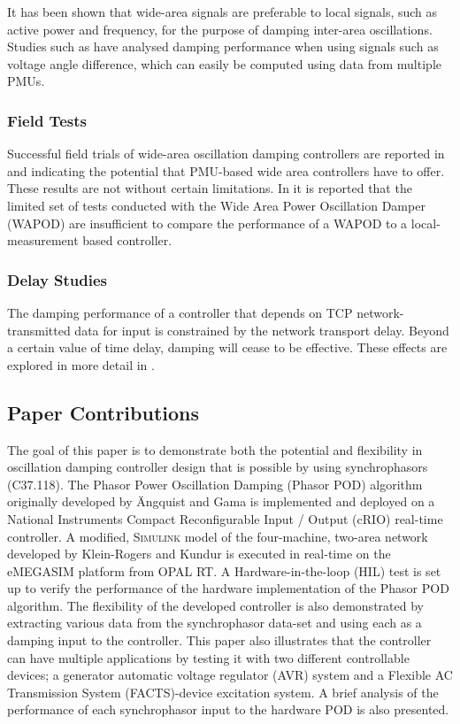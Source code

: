 \documentclass[journal]{IEEEtran}
\begin{document}
It has been shown \cite{Yuwa} that wide-area signals are preferable to local signals, such as active power and frequency, \cite{localREMcomparison} for the purpose of damping inter-area oscillations. Studies such as \cite{Yuwa} have analysed damping performance when using signals such as voltage angle difference, which can easily be computed using data from multiple PMUs.

\subsubsection*{Field Tests}
Successful field trials of wide-area oscillation damping controllers are reported in \cite{WAPODNorway} and \cite{WAPODChina} indicating the potential that PMU-based wide area controllers have to offer. These results are not without certain limitations. In \cite{WAPODNorway} it is reported that the limited set of tests conducted with the Wide Area Power Oscillation Damper (WAPOD) are insufficient to compare the performance of a WAPOD to a local-measurement based controller.

\subsubsection*{Delay Studies} The damping performance of a controller that depends on TCP network-transmitted data for input is constrained by the network transport delay. Beyond a certain value of time delay, damping will cease to be effective. These effects are explored in more detail in \cite{CommDelay}.

\subsection{Paper Contributions}
The goal of this paper is to demonstrate both the potential and flexibility in oscillation damping controller design that is possible by using synchrophasors (C37.118). The Phasor Power Oscillation Damping (Phasor POD) algorithm originally developed by \"{A}ngquist and Gama\cite{PhasorPOD} is implemented and deployed on a National Instruments Compact Reconfigurable Input / Output (cRIO) real-time controller. A modified, \textsc{Simulink} model of the four-machine, two-area network developed by Klein-Rogers and Kundur \cite{KundurTwoArea} is executed in real-time on the eMEGASIM \cite{eMEGASIM} platform from OPAL RT. A Hardware-in-the-loop (HIL) test is set up to verify the performance of the hardware implementation of the Phasor POD algorithm. The flexibility of the developed controller is also demonstrated by extracting various data from the synchrophasor data-set and using each as a damping input to the controller. This paper also illustrates that the controller can have multiple applications by testing it with two different controllable devices; a generator automatic voltage regulator (AVR) system and a Flexible AC Transmission System (FACTS)-device excitation system. A brief analysis of the performance of each synchrophasor input to the hardware POD is also presented.
\end{document}
